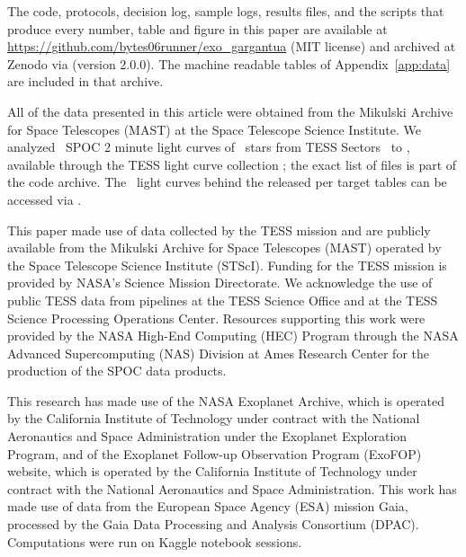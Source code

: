 \documentclass[twocolumn,linenumbers]{aastex701}
\begin{document}
The code, protocols, decision log, sample logs, results files, and the scripts that produce every number, table and figure in this paper are available at \url{https://github.com/bytes06runner/exo_gargantua} (MIT license) and archived at Zenodo via  (version 2.0.0). The machine readable tables of Appendix~\ref{app:data} are included in that archive.

All of the data presented in this article were obtained from the Mikulski Archive for Space Telescopes (MAST) at the Space Telescope Science Institute. We analyzed \mastFiles\ SPOC 2 minute light curves of \mastStars\ stars from TESS Sectors \mastSecMin\ to \mastSecMax, available through the TESS light curve collection  \citep{TESSdataDOI}; the exact list of files is part of the code archive. The \mastSubFiles\ light curves behind the released per target tables can be accessed via .

\begin{acknowledgments}
This paper made use of data collected by the TESS mission and are publicly available from the Mikulski Archive for Space Telescopes (MAST) operated by the Space Telescope Science Institute (STScI). Funding for the TESS mission is provided by NASA's Science Mission Directorate. We acknowledge the use of public TESS data from pipelines at the TESS Science Office and at the TESS Science Processing Operations Center. Resources supporting this work were provided by the NASA High-End Computing (HEC) Program through the NASA Advanced Supercomputing (NAS) Division at Ames Research Center for the production of the SPOC data products.

This research has made use of the NASA Exoplanet Archive, which is operated by the California Institute of Technology under contract with the National Aeronautics and Space Administration under the Exoplanet Exploration Program, and of the Exoplanet Follow-up Observation Program (ExoFOP) website, which is operated by the California Institute of Technology under contract with the National Aeronautics and Space Administration. This work has made use of data from the European Space Agency (ESA) mission Gaia, processed by the Gaia Data Processing and Analysis Consortium (DPAC). Computations were run on Kaggle notebook sessions.
\end{acknowledgments}

\end{document}
